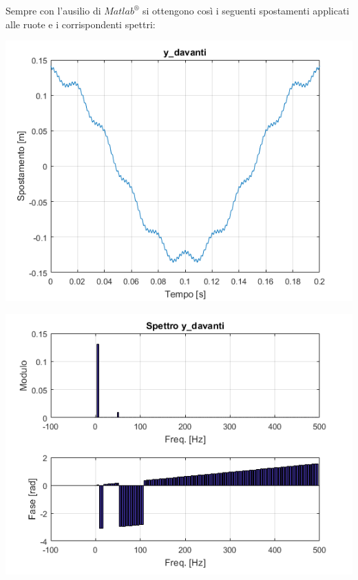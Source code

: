 \documentclass[12pt, a4paper]{article}
\begin{document}
	Sempre con l'ausilio di \textit{$Matlab^{\circledR}$} si ottengono così i seguenti spostamenti applicati alle ruote e i corrispondenti spettri:
	\\
	\begin{center}
		\includegraphics[scale=0.8]{y_davanti}
	\end{center}

	\begin{center}
		\includegraphics[scale=0.8]{spettro_y_davanti}
	\end{center}
	
\end{document}
